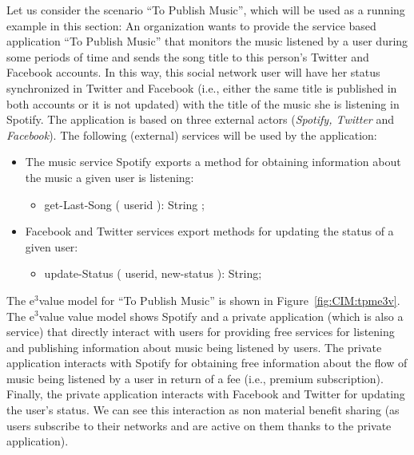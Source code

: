 \begin{example}\label{ex:toPublicMusic}
Let us consider the scenario ``To Publish Music'', which will be used as a running example in this section:
An organization wants to provide the service based application ``To Publish Music'' that monitors the music listened by a user during some periods of time and sends the song title  to this person's Twitter and Facebook accounts. 
In this way, this social network user will have her status synchronized in  Twitter and Facebook (i.e., either the same title is published in both accounts or it is not updated) with the title of the music she is listening in Spotify.
The application is based on three external actors ({\em Spotify, Twitter} and {\em Facebook}).
The following (external) services will be used by the application:
\begin{itemize}
\item The music service   Spotify exports a method for obtaining information  about the music a given user is listening:
\begin{itemize} \item {\sf\small get-Last-Song ( userid ): String} ; \end{itemize}
\item Facebook and Twitter services export methods for  updating the status of a given user:
\begin{itemize} 
\item {\sf\small update-Status ( userid, new-status ): String}; 
\end{itemize}
\end{itemize}




The e$^3$value model for ``To Publish Music'' is shown in Figure~\ref{fig:CIM:tpme3v}. 
The e$^3$value value model shows Spotify and a private application (which is also a service) that directly interact with users for providing free services for listening and publishing information about music being listened by users. The private application interacts with Spotify for obtaining free information about the flow of music being listened by a user in return of a fee (i.e., premium subscription). Finally, the private application interacts with Facebook and Twitter for updating the user's status.
We can see this interaction as non material benefit sharing (as users subscribe to their networks and are active on them thanks to the private application).
\end{example}

